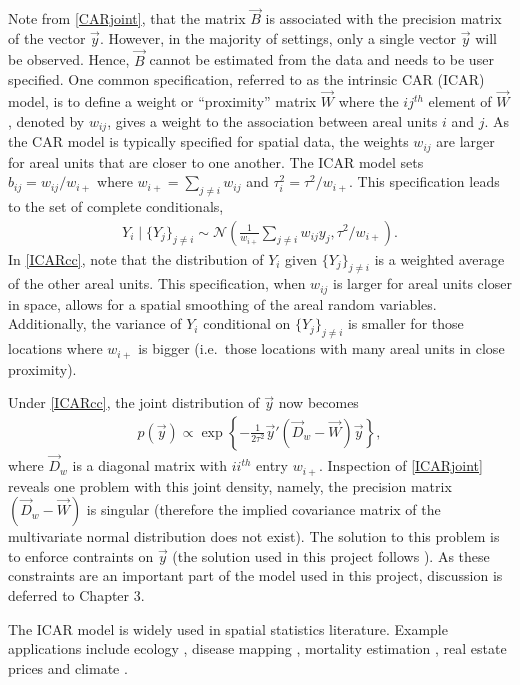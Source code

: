 Note from \eqref{CARjoint}, that the matrix $\vec{B}$ is associated with the precision matrix of the vector $\vec{y}$.  However, in the majority of settings, only a single vector $\vec{y}$ will be observed.  Hence, $\vec{B}$ cannot be estimated from the data and needs to be user specified.  One common specification, referred to as the intrinsic CAR (ICAR) model, is to define a weight or ``proximity'' matrix $\vec{W}$ where the $ij^{th}$ element of $\vec{W}$, denoted by $w_{ij}$, gives a weight to the association between areal units $i$ and $j$. As the CAR model is typically specified for spatial data, the weights $w_{ij}$ are larger for areal units that are closer to one another.  The ICAR model sets $b_{ij} = w_{ij} / w_{i+} $ where $w_{i+} = \sum_{j\neq i} w_{ij}$ and $\tau_i^2 = \tau^2/w_{i+}$.  This specification leads to the set of complete conditionals,
\begin{align}
Y_i \mid \{Y_j\}_{j\neq i} \sim \mathcal{N}\left(\frac{1}{w_{i+}}\sum_{j\neq i} w_{ij} y_j, \tau^2/w_{i+}\right).
\label{ICARcc}
\end{align}
In \eqref{ICARcc}, note that the distribution of $Y_i$ given $\{Y_j\}_{j\neq i}$ is a weighted average of the other areal units.  This specification, when $w_{ij}$ is larger for areal units closer in space, allows for a spatial smoothing of the areal random variables.  Additionally, the variance of $Y_i$ conditional on $\{Y_j\}_{j \neq i}$ is smaller for those locations where $w_{i+}$ is bigger (i.e.\ those locations with many areal units in close proximity).

Under \eqref{ICARcc}, the joint distribution of $\vec{y}$ now becomes
\begin{align}
p(\vec{y}) \propto  \exp \left\{ -\frac{1}{2 \tau^2}\vec{y}' (\vec{D}_w-\vec{W})\vec{y} \right\},
\label{ICARjoint}
\end{align}
where $\vec{D}_w$ is a diagonal matrix with $ii^{th}$ entry $w_{i+}$.  Inspection of \eqref{ICARjoint} reveals one problem with this joint density, namely, the precision matrix $(\vec{D}_w-\vec{W})$ is singular (therefore the implied covariance matrix of the multivariate normal distribution does not exist).  The solution to this problem is to enforce contraints on $\vec{y}$ (the solution used in this project follows \citet{hughes12}).  As these constraints are an important part of the model used in this project, discussion is deferred to Chapter 3.



The ICAR model is widely used in spatial statistics literature.  Example applications include ecology \citep{hesun2000}, disease mapping \citep{waller1997,lawson06}, mortality estimation \citep{macnab2000}, real estate prices \citep{pace2000} and climate \citep{zhou2012}.


